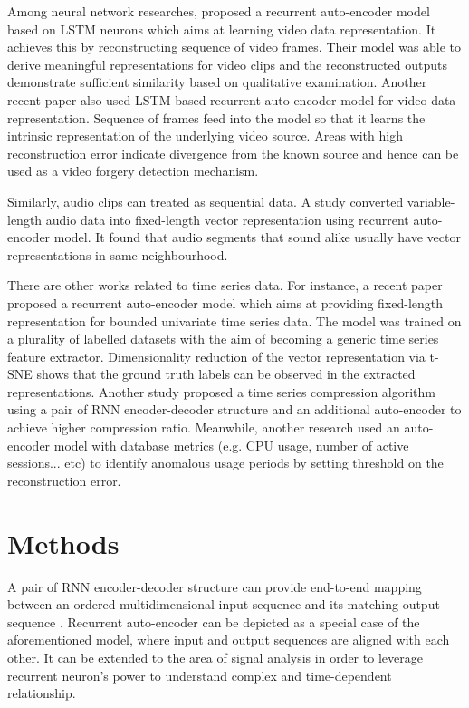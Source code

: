 \documentclass[runningheads]{llncs}
\begin{document}
Among neural network researches, \cite{srivastava-et-al} proposed a recurrent auto-encoder model based on LSTM neurons which aims at learning video data representation. It achieves this by reconstructing sequence of video frames. Their model was able to derive meaningful representations for video clips and the reconstructed outputs demonstrate sufficient similarity based on qualitative examination. Another recent paper \cite{davino} also used LSTM-based recurrent auto-encoder model for video data representation. Sequence of frames feed into the model so that it learns the intrinsic representation of the underlying video source. Areas with high reconstruction error indicate divergence from the known source and hence can be used as a video forgery detection mechanism.

Similarly, audio clips can treated as sequential data. A study \cite{chung} converted variable-length audio data into fixed-length vector representation using recurrent auto-encoder model. It found that audio segments that sound alike usually have vector representations in same neighbourhood.

There are other works related to time series data. For instance, a recent paper \cite{malhotra} proposed a recurrent auto-encoder model which aims at providing fixed-length representation for bounded univariate time series data. The model was trained on a plurality of labelled datasets with the aim of becoming a generic time series feature extractor. Dimensionality reduction of the vector representation via t-SNE shows that the ground truth labels can be observed in the extracted representations. Another study \cite{hsu} proposed a time series compression algorithm using a pair of RNN encoder-decoder structure and an additional auto-encoder to achieve higher compression ratio. Meanwhile, another research \cite{lee-d} used an auto-encoder model with database metrics (e.g. CPU usage, number of active sessions... etc) to identify anomalous usage periods by setting threshold on the reconstruction error.

\section{Methods}

A pair of RNN encoder-decoder structure can provide end-to-end mapping between an ordered multidimensional input sequence and its matching output sequence \cite{sutskever2014,cho2014}. Recurrent auto-encoder can be depicted as a special case of the aforementioned model, where input and output sequences are aligned with each other. It can be extended to the area of signal analysis in order to leverage recurrent neuron’s power to understand complex and time-dependent relationship.
\end{document}
